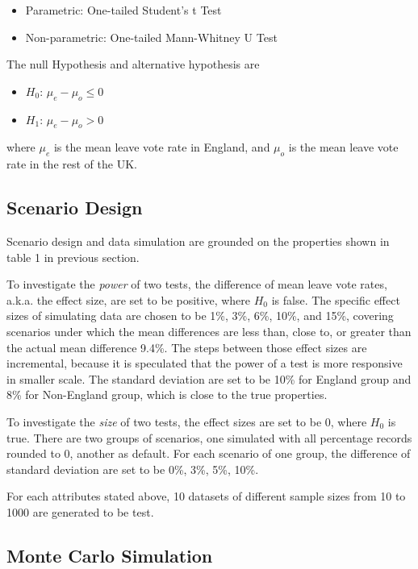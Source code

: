 \documentclass[]{article}
\begin{document}
\begin{itemize}
\item
  Parametric: One-tailed Student's t Test
\item
  Non-parametric: One-tailed Mann-Whitney U Test
\end{itemize}

The null Hypothesis and alternative hypothesis are

\begin{itemize}
\item
  \(H_0\): \(\mu_{e} - \mu_{o} \le 0\)
\item
  \(H_1\): \(\mu_{e} - \mu_{o} > 0\)
\end{itemize}

where \(\mu_{e}\) is the mean leave vote rate in England, and
\(\mu_{o}\) is the mean leave vote rate in the rest of the UK.

\hypertarget{scenario-design}{%
\subsection{Scenario Design}\label{scenario-design}}

Scenario design and data simulation are grounded on the properties shown
in table 1 in previous section.

To investigate the \emph{power} of two tests, the difference of mean
leave vote rates, a.k.a. the effect size, are set to be positive, where
\(H_0\) is false. The specific effect sizes of simulating data are
chosen to be 1\%, 3\%, 6\%, 10\%, and 15\%, covering scenarios under
which the mean differences are less than, close to, or greater than the
actual mean difference 9.4\%. The steps between those effect sizes are
incremental, because it is speculated that the power of a test is more
responsive in smaller scale. The standard deviation are set to be 10\%
for England group and 8\% for Non-England group, which is close to the
true properties.

To investigate the \emph{size} of two tests, the effect sizes are set to
be 0, where \(H_0\) is true. There are two groups of scenarios, one
simulated with all percentage records rounded to 0, another as default.
For each scenario of one group, the difference of standard deviation are
set to be 0\%, 3\%, 5\%, 10\%.

For each attributes stated above, 10 datasets of different sample sizes
from 10 to 1000 are generated to be test.

\hypertarget{monte-carlo-simulation}{%
\subsection{Monte Carlo Simulation}\label{monte-carlo-simulation}}
\end{document}
